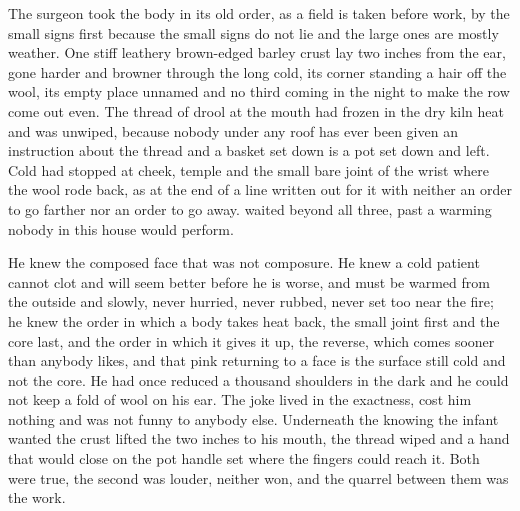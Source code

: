 The surgeon took the body in its old order, as a field is taken before work, by the small signs first because the small signs do not lie and the large ones are mostly weather. One stiff leathery brown-edged barley crust lay two inches from the ear, gone harder and browner through the long cold, its corner standing a hair off the wool, its empty place unnamed and no third coming in the night to make the row come out even. The thread of drool at the mouth had frozen in the dry kiln heat and was unwiped, because nobody under any roof has ever been given an instruction about the thread and a basket set down is a pot set down and left. Cold had stopped at cheek, temple and the small bare joint of the wrist where the wool rode back, as at the end of a line written out for it with neither an order to go farther nor an order to go away.  waited beyond all three, past a warming nobody in this house would perform.

He knew the composed face that was not composure. He knew a cold patient cannot clot and will seem better before he is worse, and must be warmed from the outside and slowly, never hurried, never rubbed, never set too near the fire; he knew the order in which a body takes heat back, the small joint first and the core last, and the order in which it gives it up, the reverse, which comes sooner than anybody likes, and that pink returning to a face is the surface still cold and not the core. He had once reduced a thousand shoulders in the dark and he could not keep a fold of wool on his ear. The joke lived in the exactness, cost him nothing and was not funny to anybody else. Underneath the knowing the infant wanted the crust lifted the two inches to his mouth, the thread wiped and a hand that would close on the pot handle set where the fingers could reach it. Both were true, the second was louder, neither won, and the quarrel between them was the work.

\scenebreak

